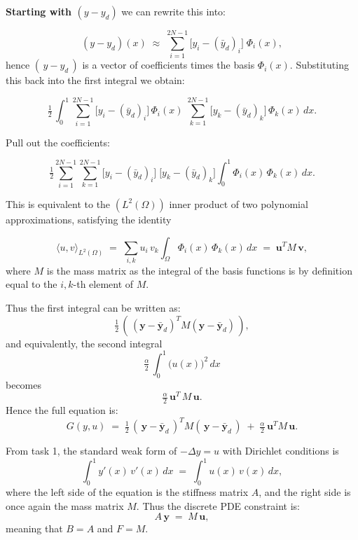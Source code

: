 \documentclass[a4paper,10pt]{article}
\begin{document}
\bigskip

\noindent
\textbf{Starting with $(y-y_{d})$} we can rewrite this into:

\[
(y - y_{d})(x)
\;\approx\;
\sum_{i=1}^{2N-1}\bigl[y_{i} - (\bar{y}_{d})_{i}\bigr]\;\Phi_{i}(x),
\]
hence $(\,y - y_{d}\,)$ is a vector of coefficients times the basis $\Phi_{i}(x)$. Substituting this back into
the first integral we obtain:

\[
\tfrac12\,\int_{0}^{1}
\sum_{i=1}^{2N-1}\bigl[y_{i} - (\bar{y}_{d})_{i}\bigr]\,\Phi_{i}(x)
\;\sum_{k=1}^{2N-1}\bigl[y_{k} - (\bar{y}_{d})_{k}\bigr]\,\Phi_{k}(x)\,dx.
\]

\noindent
Pull out the coefficients:

\[
\tfrac12
\sum_{i=1}^{2N-1}\sum_{k=1}^{2N-1}
\bigl[y_{i} - (\bar{y}_{d})_{i}\bigr]\;\bigl[y_{k} - (\bar{y}_{d})_{k}\bigr]
\int_{0}^{1}\Phi_{i}(x)\,\Phi_{k}(x)\,dx.
\]

\noindent
This is equivalent to the $(L^2(\Omega))$ inner product of two polynomial approximations, satisfying the identity

\[
\langle u,v\rangle_{L^2(\Omega)}
\;=\;
\sum_{i,k} u_{i}\,v_{k}\int_{\Omega}\Phi_{i}(x)\,\Phi_{k}(x)\,dx
\;=\;
\mathbf{u}^{T}M\,\mathbf{v},
\]
where $M$ is the mass matrix as the integral of the basis functions is by definition equal to the $i,k$-th
element of $M$.

\medskip

\noindent
Thus the first integral can be written as:
\[
\tfrac12\,(\,(\mathbf{y}-\bar{\mathbf{y}}_{d})^{T}M(\mathbf{y}-\bar{\mathbf{y}}_{d})\,),
\]
and equivalently, the second integral
\[
\tfrac{\alpha}{2}\,\int_{0}^{1}\bigl(u(x)\bigr)^{2}\,dx
\]
becomes
\[
\tfrac{\alpha}{2}\,\mathbf{u}^{T}\,M\,\mathbf{u}.
\]
Hence the full equation is:
\[
G(y,u)
\;=\;
\tfrac12\,(\,\mathbf{y}-\bar{\mathbf{y}}_{d}\,)^{T}M(\,\mathbf{y}-\bar{\mathbf{y}}_{d}\,)
\;+\;
\tfrac{\alpha}{2}\,\mathbf{u}^{T}M\,\mathbf{u}.
\]

\bigskip

\noindent
From task 1, the standard weak form of $-\Delta y = u$ with Dirichlet conditions is
\[
\int_{0}^{1}y'(x)\,v'(x)\,dx
\;=\;
\int_{0}^{1}u(x)\,v(x)\,dx,
\]
where the left side of the equation is the stiffness matrix $A$, and the right side is once again the mass matrix $M$.
Thus the discrete PDE constraint is:
\[
A\,\mathbf{y}\;=\;M\,\mathbf{u},
\]
meaning that $B = A$ and $F = M$.
\end{document}
